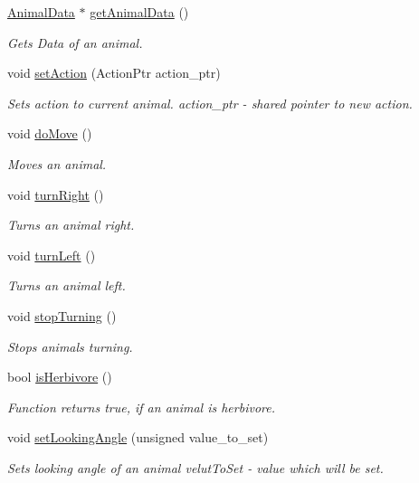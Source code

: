 \begin{DoxyCompactItemize}
\hyperlink{class_animal_data}{Animal\+Data} $\ast$ \hyperlink{class_animal_a0fb94a1af4632400b4fe8712a343dfc4}{get\+Animal\+Data} ()
\begin{DoxyCompactList}\small\item\em Gets Data of an animal. \end{DoxyCompactList}\item 
void \hyperlink{class_animal_af796c149072c673e64778b73d4371ec4}{set\+Action} (Action\+Ptr action\+\_\+ptr)
\begin{DoxyCompactList}\small\item\em Sets action to current animal.  action\+\_\+ptr -\/ shared pointer to new action. \end{DoxyCompactList}\item 
void \hyperlink{class_animal_adcfe9aacffe9761ec25da5b202b74ee1}{do\+Move} ()
\begin{DoxyCompactList}\small\item\em Moves an animal. \end{DoxyCompactList}\item 
void \hyperlink{class_animal_a5a4e742f6f59293a734c97f0bec51446}{turn\+Right} ()
\begin{DoxyCompactList}\small\item\em Turns an animal right. \end{DoxyCompactList}\item 
void \hyperlink{class_animal_a89663265c1204cbea3ac738ec6a322a0}{turn\+Left} ()
\begin{DoxyCompactList}\small\item\em Turns an animal left. \end{DoxyCompactList}\item 
void \hyperlink{class_animal_af8213ebc97b4fc1a3f19fee9223bec3a}{stop\+Turning} ()
\begin{DoxyCompactList}\small\item\em Stops animal\textquotesingle{}s turning. \end{DoxyCompactList}\item 
bool \hyperlink{class_animal_a732095e2cd7155106d07f27c66bf2c32}{is\+Herbivore} ()
\begin{DoxyCompactList}\small\item\em Function returns true, if an animal is herbivore. \end{DoxyCompactList}\item 
void \hyperlink{class_animal_a26e010f9b80815b471dea886d9499ec8}{set\+Looking\+Angle} (unsigned value\+\_\+to\+\_\+set)
\begin{DoxyCompactList}\small\item\em Sets looking angle of an animal  velut\+To\+Set -\/ value which will be set. \end{DoxyCompactList}\item 

\end{DoxyCompactItemize}
